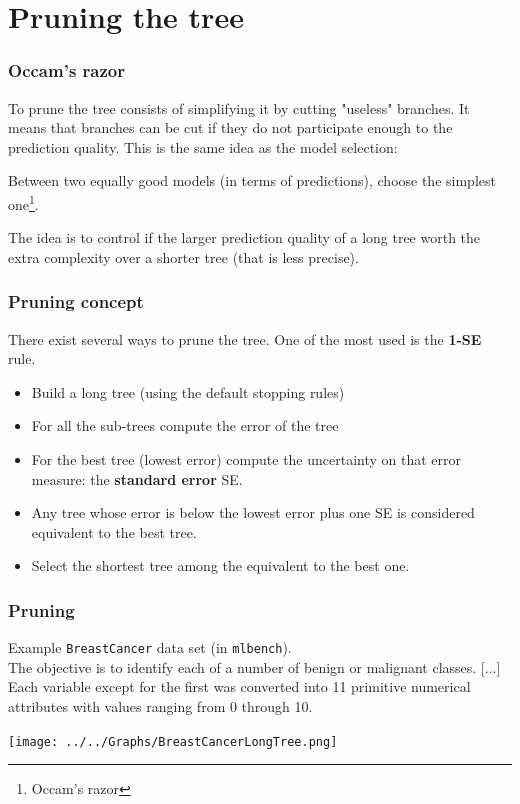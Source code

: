 \section{Pruning the tree}
\begin{frame}
\frametitle{Occam's razor}
To prune the tree consists of simplifying it by cutting "useless" branches. It means that branches can be cut if they do not participate enough to the prediction quality. This is the same idea as the model selection: 
\begin{center}
Between two equally good models (in terms of predictions), choose the simplest one\footnote{Occam's razor}.
\end{center}
The idea is to control if the larger prediction quality of a long tree worth the extra complexity over a shorter tree (that is less precise). 
\end{frame}
\begin{frame}
\frametitle{Pruning concept}
There exist several ways to prune the tree. One of the most used is the {\bf 1-SE} rule. 
\begin{itemize}
\item Build a long tree (using the default stopping rules)
\item For all the sub-trees compute the error of the tree 
\item For the best tree (lowest error) compute the uncertainty on that error measure: the {\bf standard error} SE.
\item Any tree whose error is below the lowest error plus one SE is considered equivalent to the best tree.
\item Select the shortest tree among the equivalent to the best one.
\end{itemize}
\end{frame}
\begin{frame}
\frametitle{Pruning}
Example {\tt BreastCancer} data set (in {\tt mlbench}).\\
\scriptsize
The objective is to identify each of a number of benign or malignant classes. [...] Each variable except for the first was converted into 11 primitive numerical attributes with values ranging from 0 through 10. 
\normalsize
\begin{center}
\texttt{[image: ../../Graphs/BreastCancerLongTree.png]}
\end{center}
\end{frame}

